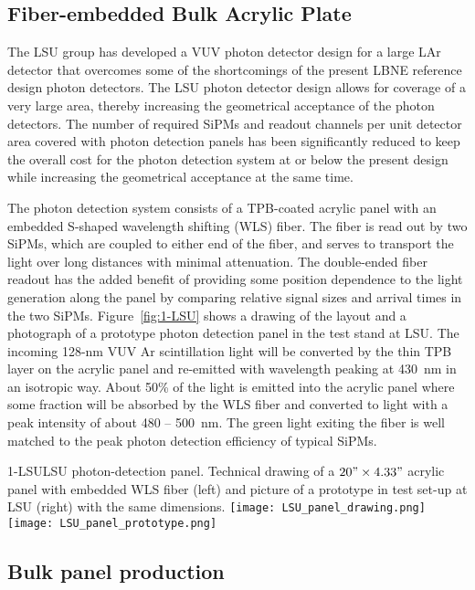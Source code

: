 \subsection{Fiber-embedded Bulk Acrylic Plate}

The LSU group has developed a VUV photon detector design for a large
LAr detector that overcomes some of the shortcomings of the present
LBNE reference design photon detectors. The LSU photon detector design
allows for coverage of a very large area, thereby increasing the
geometrical acceptance of the photon detectors. The number of required
SiPMs and readout channels per unit detector area covered with photon
detection panels has been significantly reduced to keep the overall
cost for the photon detection system at or below the present design
while increasing the geometrical acceptance at the same time.

The photon detection system consists of a TPB-coated acrylic panel
with an embedded S-shaped wavelength shifting (WLS) fiber. The fiber
is read out by two SiPMs, which are coupled to either end of the fiber,
and serves to transport the light over long distances with minimal
attenuation. The double-ended fiber readout has the added benefit of
providing some position dependence to the light generation along the
panel by comparing relative signal sizes and arrival times in the two
SiPMs. Figure~\ref{fig:1-LSU} shows a drawing of the layout and a
photograph of a prototype photon detection panel in the test stand at
LSU.  The incoming 128-nm VUV Ar scintillation light will be converted
by the thin TPB layer on the acrylic panel and re-emitted with
wavelength peaking at 430~nm in an isotropic way. About 50\% of the
light is emitted into the acrylic panel where some fraction will
be absorbed by the WLS fiber and converted to light with a peak
intensity of about 480 -- 500~nm. The green light exiting the fiber is
well matched to the peak photon detection efficiency of typical SiPMs.

\begin{cdrfigure}{1-LSU}{LSU photon-detection panel. Technical drawing of a $20"\times4.33"$ acrylic panel with embedded WLS fiber (left) and picture of a prototype in test set-up at LSU (right) with the same dimensions.}
\texttt{[image: LSU\_panel\_drawing.png]}
\texttt{[image: LSU\_panel\_prototype.png]}
\end{cdrfigure}

\subsection{Bulk panel production}

